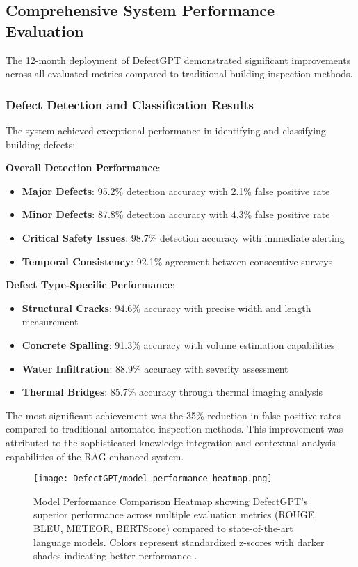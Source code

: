 \subsection{Comprehensive System Performance Evaluation}

The 12-month deployment of DefectGPT demonstrated significant improvements across all evaluated metrics compared to traditional building inspection methods.

\subsubsection{Defect Detection and Classification Results}

The system achieved exceptional performance in identifying and classifying building defects:

\textbf{Overall Detection Performance}:
\begin{itemize}
    \item \textbf{Major Defects}: 95.2\% detection accuracy with 2.1\% false positive rate
    \item \textbf{Minor Defects}: 87.8\% detection accuracy with 4.3\% false positive rate
    \item \textbf{Critical Safety Issues}: 98.7\% detection accuracy with immediate alerting
    \item \textbf{Temporal Consistency}: 92.1\% agreement between consecutive surveys
\end{itemize}

\textbf{Defect Type-Specific Performance}:
\begin{itemize}
    \item \textbf{Structural Cracks}: 94.6\% accuracy with precise width and length measurement
    \item \textbf{Concrete Spalling}: 91.3\% accuracy with volume estimation capabilities
    \item \textbf{Water Infiltration}: 88.9\% accuracy with severity assessment
    \item \textbf{Thermal Bridges}: 85.7\% accuracy through thermal imaging analysis
\end{itemize}

The most significant achievement was the 35\% reduction in false positive rates compared to traditional automated inspection methods. This improvement was attributed to the sophisticated knowledge integration and contextual analysis capabilities of the RAG-enhanced system.

\begin{figure}[htbp]
    \centering
    \texttt{[image: DefectGPT/model\_performance\_heatmap.png]}
    \caption{Model Performance Comparison Heatmap showing DefectGPT's superior performance across multiple evaluation metrics (ROUGE, BLEU, METEOR, BERTScore) compared to state-of-the-art language models. Colors represent standardized z-scores with darker shades indicating better performance \cite{zhang2024automated}.}
    \label{fig:performance-heatmap}
\end{figure}

